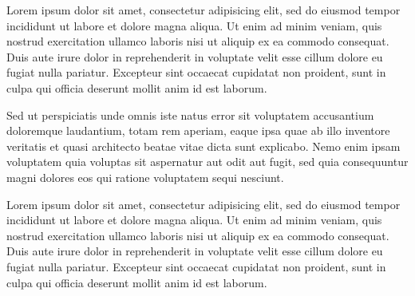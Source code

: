 Lorem ipsum dolor sit amet, consectetur adipisicing elit, sed do eiusmod 
tempor incididunt ut labore et dolore magna aliqua. Ut enim ad minim veniam, 
quis nostrud exercitation ullamco laboris nisi ut aliquip ex ea commodo 
consequat. Duis aute irure dolor in reprehenderit in voluptate velit esse 
cillum dolore eu fugiat nulla pariatur. Excepteur sint occaecat cupidatat 
non proident, sunt in culpa qui officia deserunt mollit anim id est laborum.

Sed ut perspiciatis unde omnis iste natus error sit voluptatem accusantium 
doloremque laudantium, totam rem aperiam, eaque ipsa quae ab illo inventore 
veritatis et quasi architecto beatae vitae dicta sunt explicabo. Nemo enim 
ipsam voluptatem quia voluptas sit aspernatur aut odit aut fugit, sed quia 
consequuntur magni dolores eos qui ratione voluptatem sequi nesciunt.

Lorem ipsum dolor sit amet, consectetur adipisicing elit, sed do eiusmod 
tempor incididunt ut labore et dolore magna aliqua. Ut enim ad minim veniam, 
quis nostrud exercitation ullamco laboris nisi ut aliquip ex ea commodo 
consequat. Duis aute irure dolor in reprehenderit in voluptate velit esse 
cillum dolore eu fugiat nulla pariatur. Excepteur sint occaecat cupidatat 
non proident, sunt in culpa qui officia deserunt mollit anim id est laborum.
